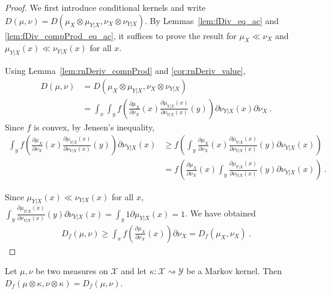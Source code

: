\begin{proof}
We first introduce conditional kernels and write $D(\mu, \nu) = D(\mu_X \otimes \mu_{Y|X}, \nu_X \otimes \nu_{Y|X})$. By Lemmas~\ref{lem:fDiv_eq_ac} and \ref{lem:fDiv_compProd_eq_ac}, it suffices to prove the result for $\mu_X \ll \nu_X$ and $\mu_{Y|X}(x) \ll \nu_{Y|X}(x)$ for all $x$.

Using Lemma~\ref{lem:rnDeriv_compProd} and \ref{cor:rnDeriv_value},
\begin{align*}
D(\mu, \nu)
&= D(\mu_X \otimes \mu_{Y|X}, \nu_X \otimes \nu_{Y|X})
\\
&= \int_x \int_y f \left( \frac{\partial \mu_X}{\partial\nu_X}(x) \frac{\partial \mu_{Y|X}(x)}{\partial\nu_{Y|X}(x)}(y) \right) \partial \nu_{Y|X}(x) \partial \nu_X
\: .
\end{align*}
Since $f$ is convex, by Jensen's inequality,
\begin{align*}
\int_y f \left( \frac{\partial \mu_X}{\partial\nu_X}(x) \frac{\partial \mu_{Y|X}(x)}{\partial\nu_{Y|X}(x)}(y) \right) \partial \nu_{Y|X}(x)
&\ge f \left( \int_y \frac{\partial \mu_X}{\partial\nu_X}(x) \frac{\partial \mu_{Y|X}(x)}{\partial\nu_{Y|X}(x)}(y) \partial \nu_{Y|X}(x) \right)
\\
&= f \left( \frac{\partial \mu_X}{\partial\nu_X}(x) \int_y \frac{\partial \mu_{Y|X}(x)}{\partial\nu_{Y|X}(x)}(y) \partial \nu_{Y|X}(x) \right)
\: .
\end{align*}

Since $\mu_{Y|X}(x) \ll \nu_{Y|X}(x)$ for all $x$, $\int_y \frac{\partial \mu_{Y|X}(x)}{\partial\nu_{Y|X}(x)}(y) \partial \nu_{Y|X}(x) = \int_y 1 \partial \mu_{Y|X}(x) = 1$. We have obtained
\begin{align*}
D_f(\mu, \nu)
\ge \int_x f \left( \frac{\partial \mu_X}{\partial\nu_X}(x)\right) \partial \nu_X
= D_f(\mu_X, \nu_X)
\: .
\end{align*}

\end{proof}

\begin{lemma}
  \label{thm:fDiv_compProd_right}
  \leanok
  Let $\mu, \nu$ be two measures on $\mathcal X$ and let $\kappa : \mathcal X \rightsquigarrow \mathcal Y$ be a Markov kernel.
  Then $D_f(\mu \otimes \kappa, \nu \otimes \kappa) = D_f(\mu, \nu)$.
\end{lemma}

